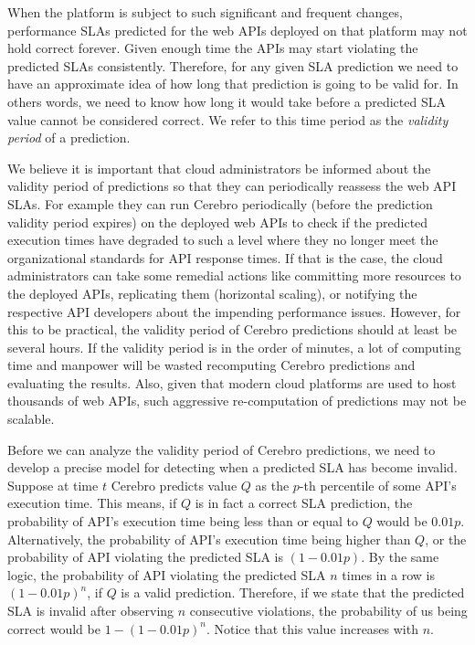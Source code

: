 When the platform is subject to such significant and frequent changes, performance SLAs predicted for the web APIs deployed on that
platform may not hold correct forever. Given enough time the APIs may start violating the predicted SLAs consistently. Therefore, for any
given SLA prediction we need to have an approximate idea of how long that prediction is going to be valid for. In others words, we need
to know how long it would take before a predicted SLA value cannot be considered correct. We refer to this time period as the 
\textit{validity period} of a prediction.


We believe
it is important that cloud administrators be informed about the validity period of predictions so that they can periodically reassess the web
API SLAs. For example they can run Cerebro periodically (before the prediction validity period expires) on the deployed web APIs to check
if the predicted execution times have degraded to such a level where they no longer meet the organizational standards for API
response times. If that is the case, the cloud administrators can take some remedial actions like committing more resources to the deployed APIs,
replicating them (horizontal scaling), or notifying the respective API developers about the impending performance issues. However,
for this to be practical, the validity period of Cerebro predictions should at least be several hours. If the validity period is in the order of minutes,
a lot of computing time and manpower will be wasted recomputing Cerebro predictions and evaluating the results. Also, given that
modern cloud platforms are used to host thousands of web APIs, such aggressive re-computation of predictions may not be scalable.

Before we can analyze the validity period of Cerebro predictions, we need to develop a precise model for detecting when a predicted SLA
has become invalid. Suppose at time $t$ Cerebro predicts value $Q$ as the $p$-th percentile of some API's execution time.
This means, if $Q$ is in fact a correct SLA prediction, the probability of API's execution time being less than or equal to $Q$ would be $0.01p$. 
Alternatively, the probability
of API's execution time being higher than $Q$, or the probability of API violating the predicted SLA is $(1-0.01p)$. By the same logic, 
the probability of API violating the predicted SLA $n$ times in a row is $(1-0.01p)^n$, if $Q$ is a valid prediction. 
Therefore, if we state that the 
predicted SLA is invalid after observing $n$ consecutive violations, the probability of us being correct would be $1 - (1-0.01p)^n$. 
Notice that this value increases with $n$. 


